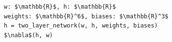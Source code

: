 \documentclass[border=10pt]{standalone}
\begin{document}
\begin{lstlisting}
w: $\mathbb{R}$, h: $\mathbb{R}$
weights: $\mathbb{R}^6$, biases: $\mathbb{R}^3$
h = two_layer_network(w, h, weights, biases)
$\nabla$(h, w)
\end{lstlisting}
\end{document}
